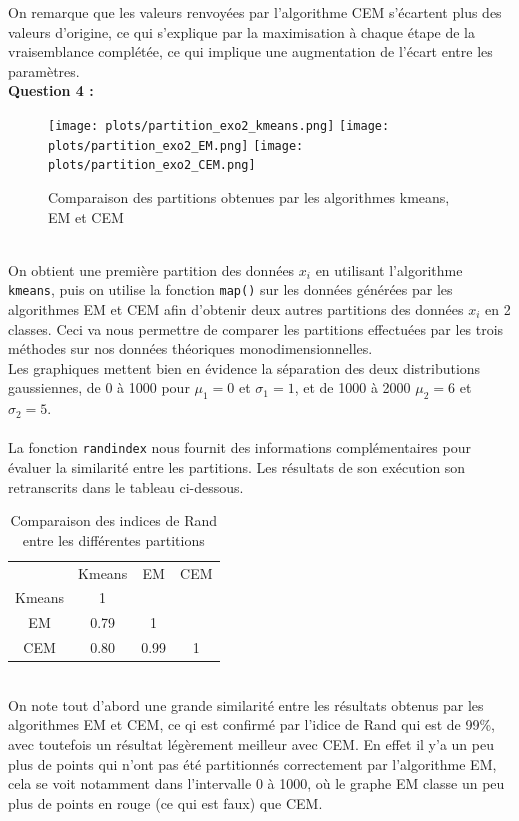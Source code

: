 \documentclass[a4paper, 10pt]{article}
\begin{document}
On remarque que les valeurs renvoyées par l’algorithme CEM s’écartent plus des valeurs d’origine,
ce qui s’explique par la maximisation à chaque étape de la vraisemblance complétée,
ce qui implique une augmentation de l’écart entre les paramètres.\\
\newpage
\noindent
\textbf{Question 4 :}
\begin{figure}[h!]
	\texttt{[image: plots/partition\_exo2\_kmeans.png]}
	\texttt{[image: plots/partition\_exo2\_EM.png]}
	\texttt{[image: plots/partition\_exo2\_CEM.png]}
  \caption{Comparaison des partitions obtenues par les algorithmes kmeans, EM et CEM }
\end{figure}\\
On obtient une première partition des données $x_{i}$ en utilisant l'algorithme \texttt{kmeans},
puis on utilise la fonction \texttt{map()} sur les données générées par les algorithmes EM et CEM afin d'obtenir deux autres partitions
des données $x_{i}$ en 2 classes. Ceci va nous permettre de comparer les partitions effectuées par les trois méthodes sur nos
données théoriques monodimensionnelles.\\
Les graphiques mettent bien en évidence la séparation des deux distributions gaussiennes, de 0 à 1000 pour $\mu_{1}=0$ et $\sigma_{1}=1$,
et de 1000 à 2000 $\mu_{2}=6$ et $\sigma_{2}=5$.\\ \\
La fonction \texttt{randindex} nous fournit des informations complémentaires pour évaluer la similarité entre les partitions.
Les résultats de son exécution son retranscrits dans le tableau ci-dessous.
\begin{table}[h]
\centering
	\begin{tabular}{cccc}
		  & Kmeans & EM & CEM\\
		Kmeans & 1 &  &  \\
		EM & 0.79 &  1 & \\
		CEM & 0.80 & 0.99 &  1\\
	\end{tabular}
  \caption{Comparaison des indices de Rand entre les différentes partitions}
\end{table}\\
On note tout d’abord une grande similarité entre les résultats obtenus par les algorithmes EM
et CEM, ce qi est confirmé par l'idice de Rand qui est de 99\%, avec toutefois un résultat légèrement meilleur avec CEM.
En effet il y'a un peu plus de points qui n'ont pas été partitionnés correctement par l’algorithme EM,
cela se voit notamment dans l'intervalle 0 à 1000, où le graphe EM classe un peu plus de points en rouge (ce qui est faux) que CEM.
\end{document}
